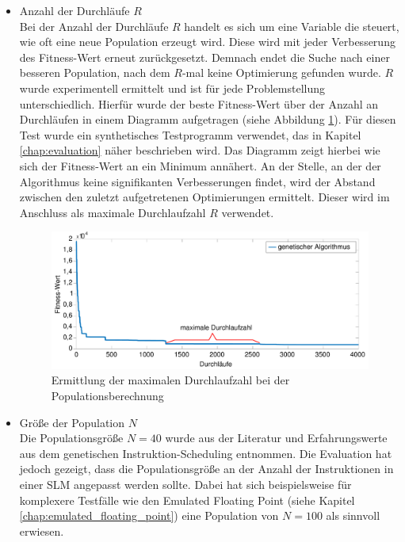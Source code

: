\begin{itemize}
	\item Anzahl der Durchläufe $R$\\
		Bei der Anzahl der Durchläufe $R$ handelt es sich um eine Variable die steuert, wie oft eine neue Population erzeugt wird. Diese wird mit jeder Verbesserung des Fitness-Wert erneut zurückgesetzt. Demnach endet die Suche nach einer besseren Population, nach dem $R$-mal keine Optimierung gefunden wurde.
		$R$ wurde experimentell ermittelt und ist für jede Problemstellung unterschiedlich. Hierfür wurde der beste Fitness-Wert über der Anzahl an Durchläufen in einem Diagramm aufgetragen (siehe Abbildung \ref{fig:iteration_analyse}). Für diesen Test wurde ein synthetisches Testprogramm verwendet, das in Kapitel \ref{chap:evaluation} näher beschrieben wird. Das Diagramm zeigt hierbei wie sich der Fitness-Wert an ein Minimum annähert. An der Stelle, an der der Algorithmus keine signifikanten Verbesserungen findet, wird der Abstand zwischen den zuletzt aufgetretenen Optimierungen ermittelt. Dieser wird im Anschluss als maximale Durchlaufzahl $R$ verwendet.
		
		\begin{figure}[H]
			\centering
			\includegraphics[width=\textwidth]{fig/iteration_analyse.pdf}
			\caption{Ermittlung der maximalen Durchlaufzahl bei der Populationsberechnung}
			\label{fig:iteration_analyse}
		\end{figure}
	\newpage
	\item Größe der Population $N$\\
		Die Populationsgröße $N = 40$ wurde aus der Literatur \cite{grefenstette1986optimization} und Erfahrungswerte aus dem genetischen Instruktion-Scheduling entnommen. Die Evaluation hat jedoch gezeigt, dass die Populationsgröße an der Anzahl der Instruktionen in einer SLM angepasst werden sollte. Dabei hat sich beispielsweise für komplexere Testfälle wie den Emulated Floating Point (siehe Kapitel \ref{chap:emulated_floating_point}) eine Population von $N = 100$ als sinnvoll erwiesen.
	

\end{itemize}
